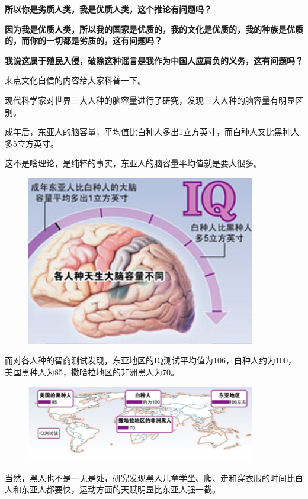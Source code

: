 \documentclass[UTF8, 11pt, oneside]{ctexart}
\newcommand{\zd}[1]{\textbf{\textcolor[RGB]{123,12,0}{#1}}} %
\begin{document}
\zd{所以你是劣质人类，我是优质人类，这个推论有问题吗？}

\zd{因为我是优质人类，所以我的国家是优质的，我的文化是优质的，我的种族是优质的，而你的一切都是劣质的，这有问题吗？}

\zd{我说这属于殖民入侵，破除这种谣言是我作为中国人应肩负的义务，这有问题吗？}

来点文化自信的内容给大家科普一下。

现代科学家对世界三大人种的脑容量进行了研究，发现三大人种的脑容量有明显区别。

成年后，东亚人的脑容量，平均值比白种人多出1立方英寸，而白种人又比黑种人多5立方英寸。

这不是啥理论，是纯粹的事实，东亚人的脑容量平均值就是要大很多。

\begin{figure}[H]
    \centering
    \includegraphics[width=10cm]{2023-03-30-003}
\end{figure}

而对各人种的智商测试发现，东亚地区的IQ测试平均值为106，白种人约为100，美国黑种人为85，撒哈拉地区的非洲黑人为70。

\begin{figure}[H]
    \centering
    \includegraphics[width=10cm]{2023-03-30-004}
\end{figure}

当然，黑人也不是一无是处，研究发现黑人儿童学坐、爬、走和穿衣服的时间比白人和东亚人都要快，运动方面的天赋明显比东亚人强一截。
\end{document}
